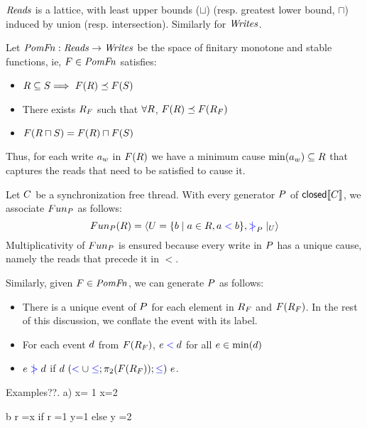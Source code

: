 $\mathit{Reads}$ is a lattice, with least upper bounds ($\sqcup$) (resp. greatest lower bound, $\sqcap$)  induced by union (resp. intersection).  Similarly for $\mathit{Writes}$. 

\begin{definition}
Let $\mathit{PomFn}: \mathit{Reads} \rightarrow \mathit{Writes}$ be the space of finitary monotone and stable functions, ie, $F \in \mathit{PomFn}$ satisfies:
\begin{itemize}
\item $R \subseteq S \Longrightarrow\ F(R) \preceq F(S)$
\item There exists $R_{F}$ such that $\forall R$, $F(R) \preceq F(R_{F})$
\item $F(R \sqcap S) =  F(R) \sqcap F(S)$
\end{itemize}
\end{definition}
Thus, for each write  $a_w$ in $F(R)$ we have a minimum cause $\min(a_w) \subseteq R$ that captures the reads that need to be satisfied to cause it.   

Let $C$ be a synchronization free thread.   With every generator $P$ of  $\textsf{closed}\llbracket C\rrbracket$, we associate $Fun_{P}$ as follows:
\[ Fun_{P}(R) = \langle U = \{ b \mid a \in R, a \mathrel{{\color{blue}<}} b \}, \mathrel{{\color{blue}\mkern4mu\mid\!\!\!>}}_{P} \mathbin{|}_{U} \rangle \]
Multiplicativity  of $Fun_{P}$ is ensured because every write in $P$ has a unique cause, namely the reads that precede it in $\lt$.

Similarly, given $F \in \mathit{PomFn}$, we can generate $P$ as follows:
\begin{itemize}
\item There is a unique event of $P$ for each element in $R_{F}$ and $F(R_{F})$.  In the rest of this discussion, we conflate the event with its label.
\item For each event $d$ from $F(R_{F})$, $e \mathrel{{\color{blue}<}} d$ for all $e \in \min(d)$
\item $e \mathrel{{\color{blue}\mkern4mu\mid\!\!\!>}} d$ if $ d\ (\mathrel{{\color{blue}<}} \cup \mathrel{{\color{blue}\leq}};\pi_2(F(R_{F})); \mathrel{{\color{blue}\leq}}) \  e$.
\end{itemize}

Examples??.  
a) x= 1
x=2

b  r =x
   if r =1  {y=1}
   else      {y =2}

